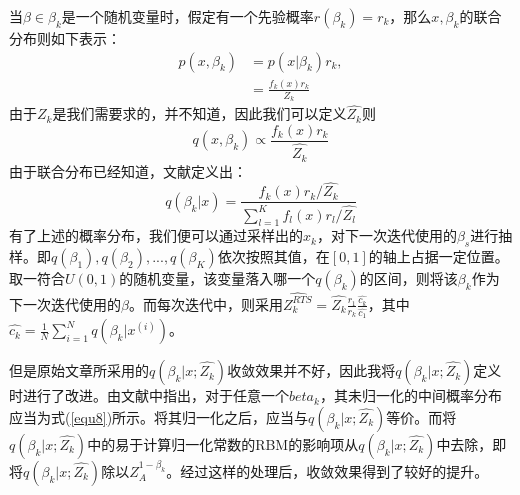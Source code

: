 \documentclass[journal,a4paper]{IEEEtran}
\begin{document}
	当$\beta \in \beta_k$是一个随机变量时，假定有一个先验概率$r(\beta_k)=r_k$，那么$x,\beta_k$的联合分布则如下表示：
	\begin{align}
	p(x,\beta_k) & = p(x|\beta_k)r_k, \\
	& = \frac{f_k(x)r_k}{Z_k}
	\end{align}
	由于$Z_k$是我们需要求的，并不知道，因此我们可以定义$\hat{Z_k}$则
	\begin{equation}
	q(x,\beta_k) \propto \frac{f_k(x)r_k}{\hat{Z_k}}
	\end{equation}
	由于联合分布已经知道，文献\cite{carlson2016partition}定义出：
	\begin{equation}
	q(\beta_k|x) = \frac{f_k(x)r_k/\hat{Z_k}}{\sum_{l=1}^{K} f_l(x)r_l/\hat{Z_l}}
	\end{equation}
	有了上述的概率分布，我们便可以通过采样出的$x_k$，对下一次迭代使用的$\beta_s$进行抽样。即$q(\beta_1),q(\beta_2),...,q(\beta_K)$依次按照其值，在$[0,1]$的轴上占据一定位置。取一符合$U(0,1)$的随机变量，该变量落入哪一个$q(\beta_k)$的区间，则将该$\beta_k$作为下一次迭代使用的$\beta$。而每次迭代中，则采用$ \hat{Z_k^{RTS}} = \hat{Z_k}\frac{r_1}{r_k}\frac{\hat{c_k}}{\hat{c_1}}$，其中$\hat{c_k}=\frac{1}{N} \sum_{i=1}^N q(\beta_k|x^{(i)})$。

	但是原始文章所采用的$q(\beta_k|x;\hat{Z_k})$收敛效果并不好，因此我将$q(\beta_k|x;\hat{Z_k})$定义时进行了改进。由文献\cite{salakhutdinov2009learning}中指出，对于任意一个$beta_k$，其未归一化的中间概率分布应当为式(\ref{equ8})所示。将其归一化之后，应当与$q(\beta_k|x;\hat{Z_k})$等价。而将$q(\beta_k|x;\hat{Z_k})$中的易于计算归一化常数的RBM的影响项从$q(\beta_k|x;\hat{Z_k})$中去除，即将$q(\beta_k|x;\hat{Z_k})$除以$Z_A^{1-\beta_k}$。经过这样的处理后，收敛效果得到了较好的提升。
\end{document}
